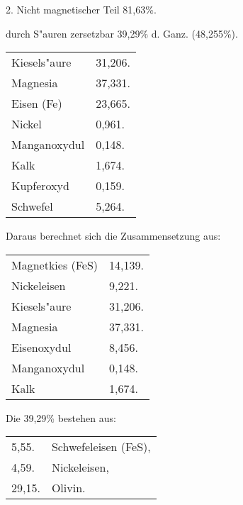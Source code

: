 \documentclass[a4paper, 11pt, oneside]{article}
\begin{document}
\begin{center}
2. Nicht magnetischer Teil 81,63\%.
\end{center}

\begin{center}
durch S"auren zersetzbar 39,29\% d. Ganz. (48,255\%).
\end{center}

\begin{table}[H]
    \centering
    \begin{tabular}{l l}
        \hline
        Kiesels"aure & 31,206. \\
        Magnesia & 37,331. \\
        Eisen (Fe) & 23,665. \\
        Nickel & 0,961. \\
        Manganoxydul & 0,148. \\
        Kalk & 1,674. \\
        Kupferoxyd & 0,159. \\
        Schwefel & 5,264. \\
    \end{tabular}
\end{table}

\begin{center}
Daraus berechnet sich die Zusammensetzung aus:
\end{center}

\begin{table}[H]
    \centering
    \begin{tabular}{l l}
        Magnetkies (FeS) & 14,139. \\
        Nickeleisen & 9,221. \\
        Kiesels"aure & 31,206. \\
        Magnesia & 37,331. \\
        Eisenoxydul & 8,456. \\
        Manganoxydul & 0,148. \\
        Kalk & 1,674. \\
    \end{tabular}
\end{table}

\begin{center}
Die 39,29\% bestehen aus:
\end{center}

\begin{table}[H]
    \centering
    \begin{tabular}{l l}
        5,55. & Schwefeleisen (FeS), \\
        4,59. & Nickeleisen, \\
        29,15. & Olivin. \\
    \end{tabular}
\end{table}
\end{document}
